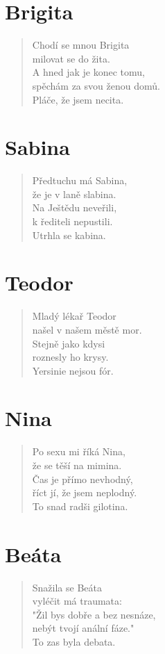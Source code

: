 \section*{Brigita}
\begin{verse}
Chodí se mnou Brigita\\
milovat se do žita.\\
A hned jak je konec tomu,\\
spěchám za svou ženou domů.\\
Pláče, že jsem necita.
\end{verse}

\section*{Sabina}
\begin{verse}
Předtuchu má Sabina,\\
že je v laně slabina.\\
Na Ještědu neveřili,\\
k řediteli nepustili.\\
Utrhla se kabina.
\end{verse}

\section*{Teodor}
\begin{verse}
Mladý lékař Teodor\\
našel v našem městě mor.\\
Stejně jako kdysi\\
roznesly ho krysy.\\
Yersinie nejsou fór.
\end{verse}

\section*{Nina}
\begin{verse}
Po sexu mi říká Nina,\\
že se těší na mimina.\\
Čas je přímo nevhodný,\\
říct jí, že jsem neplodný.\\
To snad radši gilotina.
\end{verse}

\section*{Beáta}
\begin{verse}
Snažila se Beáta\\
vyléčit má traumata:\\
"Žil bys dobře a bez nesnáze,\\
nebýt tvojí anální fáze."\\
To zas byla debata.
\end{verse}

